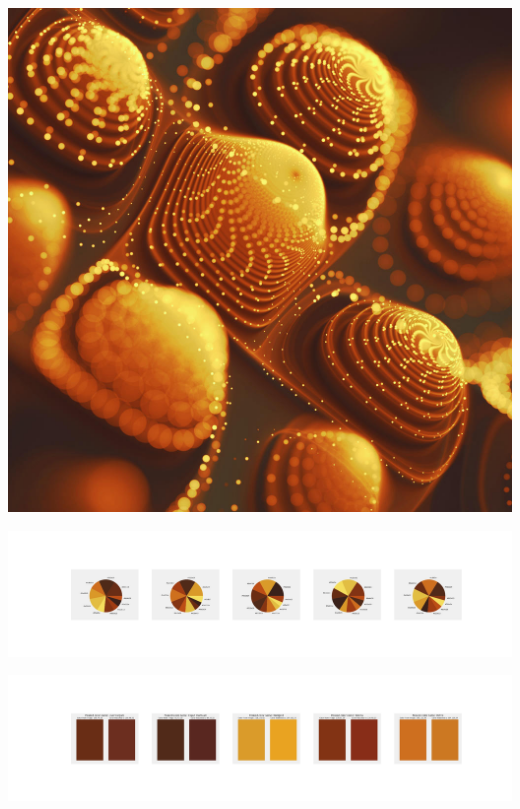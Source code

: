 \documentclass[11pt]{article}
\begin{document}
\begin{landscape}
    \begin{center}
    \includegraphics[width=\textwidth]{./nbimg/file (302).jpg}
    \end{center}

    \begin{center}
    \includegraphics[width=250mm]{./nbimg/pie-226.jpg}
    \end{center}

    \begin{center}
    \includegraphics[width=250mm]{./nbimg/peak-226.jpg}
    \end{center}
    


\end{landscape}
\end{document}
